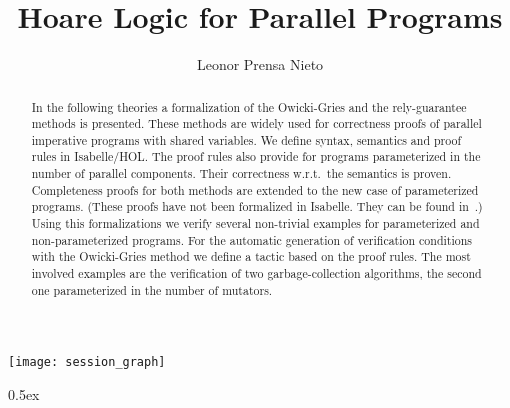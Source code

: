 \documentclass[11pt,a4paper]{book}
\begin{document}
\title{Hoare Logic for Parallel Programs}
\author{Leonor Prensa Nieto}
\maketitle

\begin{abstract}\noindent
  In the following theories a formalization of the Owicki-Gries and
  the rely-guarantee methods is presented. These methods are widely
  used for correctness proofs of parallel imperative programs with
  shared variables.  We define syntax, semantics and proof rules in
  Isabelle/HOL.  The proof rules also provide for programs
  parameterized in the number of parallel components. Their
  correctness w.r.t.\ the semantics is proven.  Completeness proofs
  for both methods are extended to the new case of parameterized
  programs. (These proofs have not been formalized in Isabelle. They
  can be found in~\cite{Prensa-PhD}.)  Using this formalizations we
  verify several non-trivial examples for parameterized and
  non-parameterized programs.  For the automatic generation of
  verification conditions with the Owicki-Gries method we define a
  tactic based on the proof rules.  The most involved examples are the
  verification of two garbage-collection algorithms, the second one
  parameterized in the number of mutators.

\end{abstract}

\pagestyle{plain}
\thispagestyle{empty}
\tableofcontents

\clearpage

\begin{center}
  \texttt{[image: session\_graph]}  
\end{center}

\newpage

\parindent 0pt\parskip 0.5ex


%
%
\end{document}
